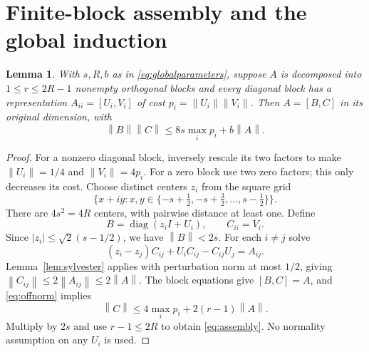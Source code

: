 \documentclass[11pt]{article}
\newtheorem{lemma}[theorem]{Lemma}
\theoremstyle{remark}
\newcommand{\diag}{\operatorname{diag}}
\newcommand{\norm}[1]{\left\lVert#1\right\rVert}
\newcommand{\comm}[2]{[#1,#2]}
\numberwithin{equation}{section}
\begin{document}
\section{Finite-block assembly and the global induction}\label{sec:assembly}
\begin{lemma}\label{lem:assembly}
With $s,R,b$ as in \eqref{eq:globalparameters}, suppose $A$ is decomposed into
$1\le r\le2R-1$ nonempty orthogonal blocks and every diagonal block has a
representation $A_{ii}=\comm{U_i}{V_i}$ of cost
$p_i=\norm{U_i}\norm{V_i}$. Then $A=\comm BC$ in its original dimension, with
\begin{equation}\label{eq:assembly}
 \norm B\norm C\le8s\max_i p_i+b\norm A.
\end{equation}
\end{lemma}
\begin{proof}
For a nonzero diagonal block, inversely rescale its two factors to make
$\norm{U_i}=1/4$ and $\norm{V_i}=4p_i$. For a zero block use two zero factors;
this only decreases its cost. Choose distinct centers $z_i$ from the square grid
\[
 \{x+iy:x,y\in\{-s+\tfrac12,-s+\tfrac32,\ldots,s-\tfrac12\}\}.
\]
There are $4s^2=4R$ centers, with pairwise distance at least one. Define
\[
 B=\diag(z_iI+U_i),\qquad C_{ii}=V_i.
\]
Since $|z_i|\le\sqrt2(s-1/2)$, we have $\norm B<2s$. For each $i\ne j$ solve
\[
 (z_i-z_j)C_{ij}+U_iC_{ij}-C_{ij}U_j=A_{ij}.
\]
Lemma~\ref{lem:sylvester} applies with perturbation norm at most $1/2$, giving
$\norm{C_{ij}}\le2\norm{A_{ij}}\le2\norm A$. The block equations give
$\comm BC=A$, and \eqref{eq:offnorm} implies
\[
 \norm C\le4\max_i p_i+2(r-1)\norm A.
\]
Multiply by $2s$ and use $r-1\le2R$ to obtain \eqref{eq:assembly}.
No normality assumption on any $U_i$ is used.
\end{proof}
\end{document}
